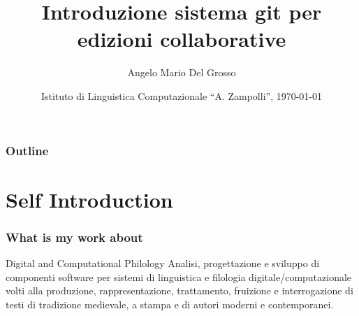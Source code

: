 \documentclass{beamer}
\title{Introduzione sistema git per edizioni collaborative}
\author[A.M. Del Grosso]{Angelo Mario Del Grosso}
\institute{\texttt{angelo.delgrosso@ilc.cnr.it} \\\bigskip\textit{CNR-ILC-LicoLab}}
\date{Istituto di Linguistica Computazionale ``A. Zampolli'', \today}
\begin{document}
\begin{frame}
	\maketitle
\end{frame}

\begin{frame}
	\frametitle{Outline}
	\tableofcontents
\end{frame}

\section{Self Introduction}

\begin{frame}
	\frametitle{What is my work about}
	\addtocounter{nframe}{1}

	\begin{block}{Digital and Computational Philology}
		Analisi, progettazione e sviluppo di componenti software per sistemi di linguistica e filologia digitale/computazionale volti alla produzione, rappresentazione, trattamento, fruizione e interrogazione di testi di tradizione medievale, a stampa e di autori moderni e contemporanei.
	\end{block}



\end{frame}
\end{document}
